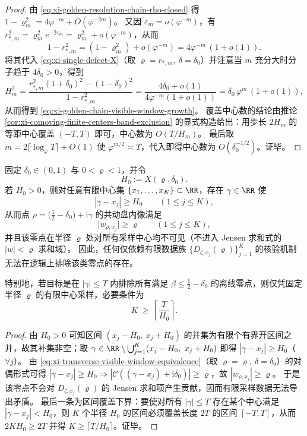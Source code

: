 \begin{proof}
由 \eqref{eq:xi-golden-resolution-chain-rho-closed} 得
\(
1-\varrho_m^2=4\varphi^{-m}+O(\varphi^{-2m})
\)。
又因 \(\varepsilon_m=o(\varphi^{-m})\)，有
\(
r_{\ast,m}^2=\varrho_m^2e^{-2\varepsilon_m}=\varrho_m^2+o(\varphi^{-m})
\)，从而
\[
1-r_{\ast,m}^2
=(1-\varrho_m^2)+o(\varphi^{-m})
=4\varphi^{-m}\,(1+o(1)).
\]
将其代入 \eqref{eq:xi-single-defect-X}（取 \(\varrho=r_{\ast,m},\ \delta=\delta_0\)）并注意当 \(m\) 充分大时分子趋于 \(4\delta_0>0\)，得到
\[
H_m^2
=\frac{r_{\ast,m}^2(1+\delta_0)^2-(1-\delta_0)^2}{1-r_{\ast,m}^2}
=\frac{4\delta_0+o(1)}{4\varphi^{-m}(1+o(1))}
=\delta_0\,\varphi^{m}\,(1+o(1)),
\]
从而得到 \eqref{eq:xi-golden-chain-visible-window-growth}。
覆盖中心数的结论由推论 \ref{cor:xi-comoving-finite-centers-band-exclusion} 的显式构造给出：用步长 \(2H_m\) 的等距中心覆盖 \((-T,T)\) 即可，中心数为 \(O(T/H_m)\)。
最后取 \(m=2\lceil\log_\varphi T\rceil+O(1)\) 使 \(\varphi^{m/2}\asymp T\)，代入即得中心数为 \(O(\delta_0^{-1/2})\)。证毕。
\end{proof}

\begin{proposition}\label{prop:xi-comoving-finite-centers-blindspot}
固定 \(\delta_0\in(0,1)\) 与 \(0<\varrho<1\)，并令
\[
H_0:=X(\varrho,\delta_0).
\]
若 \(H_0>0\)，则对任意有限中心集 \(\{x_1,\dots,x_K\}\subset\RR\)，存在 \(\gamma\in\RR\) 使
\[
|\gamma-x_j|\ge H_0\qquad(1\le j\le K),
\]
从而点 \(\rho=\bigl(\tfrac12-\delta_0\bigr)+\mathrm{i}\gamma\) 的共动盘内像满足
\[
\bigl|w_{\rho,x_j}\bigr|\ge \varrho\qquad(1\le j\le K),
\]
并且该零点在半径 \(\varrho\) 处对所有采样中心均不可见（不进入 Jensen 求和式的 \(|w|<\varrho\) 求和域）。
因此，任何仅依赖有限数据族 \(\{D_{\zeta,x_j}(\varrho)\}_{j=1}^{K}\) 的核验机制无法在逻辑上排除该类零点的存在。
\par
特别地，若目标是在 \(|\gamma|\le T\) 内排除所有满足 \(\beta\le\tfrac12-\delta_0\) 的离线零点，则仅凭固定半径 \(\varrho\) 的有限中心采样，必要条件为
\[
K\ \ge\ \left\lceil\frac{T}{H_0}\right\rceil.
\]
\end{proposition}

\begin{proof}
由 \(H_0>0\) 可知区间 \((x_j-H_0,\ x_j+H_0)\) 的并集为有限个有界开区间之并，故其补集非空；取
\(
\gamma\in\RR\setminus\bigcup_{j=1}^{K}(x_j-H_0,\ x_j+H_0)
\)
即得 \(|\gamma-x_j|\ge H_0\)（\(\forall j\)）。
由 \eqref{eq:xi-transverse-visible-window-equivalence}（取 \(\varrho=\varrho,\ \delta=\delta_0\)）的对偶形式可得
\(
|\gamma-x_j|\ge H_0\Rightarrow |\mathcal{C}((\gamma-x_j)+\mathrm{i}\delta_0)|\ge\varrho
\)，故 \(|w_{\rho,x_j}|\ge\varrho\)。
于是该零点不会对 \(D_{\zeta,x_j}(\varrho)\) 的 Jensen 求和项产生贡献，因而有限采样数据无法导出矛盾。
最后一条为区间覆盖下界：要使对所有 \(|\gamma|\le T\) 存在某个中心满足 \(|\gamma-x_j|<H_0\)，则 \(K\) 个半径 \(H_0\) 的区间必须覆盖长度 \(2T\) 的区间 \([-T,T]\)，从而 \(2KH_0\ge 2T\) 并得 \(K\ge\lceil T/H_0\rceil\)。证毕。
\end{proof}

